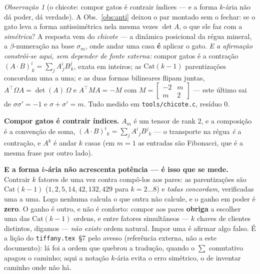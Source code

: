 \documentclass[11pt]{article}
\newcommand{\code}[1]{\texttt{\small #1}}
\theoremstyle{plain}
\theoremstyle{remark}
\newtheorem{obs}{Observação}
\begin{document}
\begin{obs}[o chicote: compor gatos é contrair índices --- e a forma $k$-ária não dá poder, dá verdade]\label{obs:chicote}
A Obs.~\ref{obs:anti} deixou o par montado sem o fechar: se o gato leva a forma antissimétrica nela
mesma vezes $\det A$, o que ele faz com a \emph{simétrica}? A resposta vem do \emph{chicote} --- a
dinâmica posicional da régua mineral, a $\beta$-numeração na base $\sigma_m$, onde andar uma casa
\textbf{é} aplicar o gato. \emph{E a afirmação constrói-se aqui, sem depender de fonte externa:}
compor gatos é a contração $\left(A\!\cdot\!B\right)^i_{\,k}=\sum_j A^i_{\,j}B^j_{\,k}$, exata em
inteiros; as $\mathrm{Cat}(k-1)$ parentizações concordam uma a uma; e as duas formas bilineares
flipam juntas, $A^{\!\top}\Omega A=\det(A)\,\Omega$ e $A^{\!\top}MA=-M$ com
$M=\left[\begin{smallmatrix}-2&m\\m&2\end{smallmatrix}\right]$ --- este último sai de
$\sigma\sigma'=-1$ e $\sigma+\sigma'=m$. Tudo medido em \code{tools/chicote.c}, resíduo $0$.

\textbf{Compor gatos é contrair índices.} $A_m$ é um tensor de rank $2$, e a composição é a convenção
de soma, $(A\!\cdot\!B)^{i}{}_{k}=\sum_j A^{i}{}_{j}B^{j}{}_{k}$ --- o transporte na régua \emph{é} a
contração, e $A^k$ é andar $k$ casas (em $m=1$ as entradas são Fibonacci, que é a mesma frase por
outro lado).

\textbf{E a forma $k$-ária não acrescenta potência --- é isso que se mede.} Contrair $k$ fatores de uma
vez contra compô-los aos pares: as parentizações são $\mathrm{Cat}(k-1)$ ($1,2,5,14,42,132,429$ para
$k=2\ldots8$) e \emph{todas concordam}, verificadas uma a uma. Logo nenhuma calcula o que outra não
calcule, e o ganho em poder é \textbf{zero}. O ganho é outro, e não é conforto: compor aos pares
\textbf{obriga} a escolher uma das $\mathrm{Cat}(k-1)$ ordens, e entre fatores simultâneos --- $k$
chaves de clientes distintos, digamos --- \emph{não existe} ordem natural. Impor uma é afirmar algo
falso. É a lição do \code{tiffany.tex}~§7 pelo avesso (referência externa, não a este documento): lá foi a ordem que quebrou a tradução, quando o $\sum$ comutativo
apagou o caminho; aqui a notação $k$-ária evita o erro simétrico, o de inventar caminho onde não há.


\end{obs}
\end{document}
